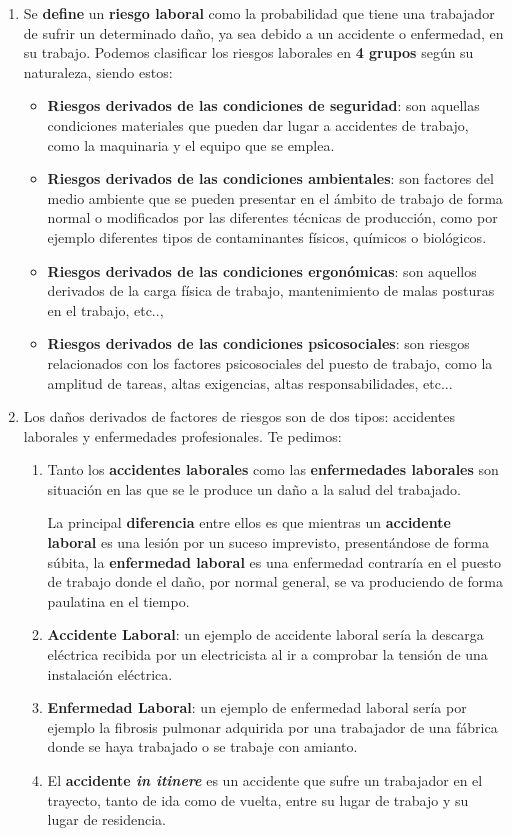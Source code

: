\begin{enumerate}[label=\alph*)]
    \item Se \textbf{define} un \textbf{riesgo laboral} como la probabilidad que tiene una trabajador de sufrir un determinado daño, ya sea debido a un accidente o enfermedad, en su trabajo. Podemos clasificar los riesgos laborales en \textbf{4 grupos} según su naturaleza, siendo estos:
    \begin{itemize}
        \item \textbf{Riesgos derivados de las condiciones de seguridad}: son aquellas condiciones materiales que pueden dar lugar a accidentes de trabajo, como la maquinaria y el equipo que se emplea.
        \item \textbf{Riesgos derivados de las condiciones ambientales}: son factores del medio ambiente que se pueden presentar en el ámbito de trabajo de forma normal o modificados por las diferentes técnicas de producción, como por ejemplo diferentes tipos de contaminantes físicos, químicos o biológicos.
        \item \textbf{Riesgos derivados de las condiciones ergonómicas}: son aquellos derivados de la carga física de trabajo, mantenimiento de malas posturas en el trabajo, etc..,
        \item \textbf{Riesgos derivados de las condiciones psicosociales}: son riesgos relacionados con los factores psicosociales del puesto de trabajo, como la amplitud de tareas, altas exigencias, altas responsabilidades, etc...
    \end{itemize}
    \item Los daños derivados de factores de riesgos son de dos tipos: accidentes laborales y enfermedades profesionales. Te pedimos:
    \begin{enumerate}
        \item Tanto los \textbf{accidentes laborales} como las \textbf{enfermedades laborales} son situación en las que se le produce un daño a la salud del trabajado.

        La principal \textbf{diferencia} entre ellos es que mientras un \textbf{accidente laboral} es una lesión por un suceso imprevisto, presentándose de forma súbita, la \textbf{enfermedad laboral} es una enfermedad contraría en el puesto de trabajo donde el daño, por normal general, se va produciendo de forma paulatina en el tiempo.
        \item \textbf{Accidente Laboral}: un ejemplo de accidente laboral sería la descarga eléctrica recibida por un electricista al ir a comprobar la tensión de una instalación eléctrica.
        \item \textbf{Enfermedad Laboral}: un ejemplo de enfermedad laboral sería por ejemplo la fibrosis pulmonar adquirida por una trabajador de una fábrica donde se haya trabajado o se trabaje con amianto.
        \item El \textbf{accidente \textit{in itinere}} es un accidente que sufre un trabajador en el trayecto, tanto de ida como de vuelta, entre su lugar de trabajo y su lugar de residencia.
    \end{enumerate}
\end{enumerate}

